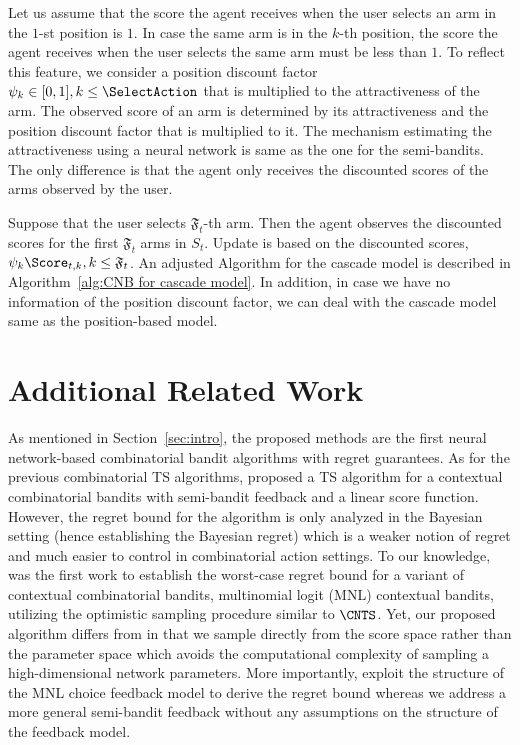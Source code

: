 \documentclass{article}
\theoremstyle{plain}
\begin{document}
Let us assume that the score the agent receives when the user selects an arm in the $1$-st position is $1$. 
In case the same arm is in the $k$-th position, the score the agent receives when the user selects the same arm must be less than $1$.
To reflect this feature, we consider a position discount factor $\psi_k \in [0,1], k \le \SelectAction$ that is multiplied to the attractiveness of the arm.
The observed score of an arm is determined by its attractiveness and the position discount factor that is multiplied to it.
The mechanism estimating the attractiveness using a neural network is same as the one for the semi-bandits.
The only difference is that the agent only receives the discounted scores of the arms observed by the user.

Suppose that the user selects $\mathfrak{F}_t$-th arm.
Then the agent observes the discounted scores for the first $\mathfrak{F}_t$ arms in $S_t$. 
Update is based on the discounted scores, $\psi_k \Score_{t,k}, k \le \mathfrak{F}_t$. 
An adjusted Algorithm for the cascade model is described in Algorithm~\ref{alg:CNB for cascade model}.
In addition, in case we have no information of the position discount factor, we can deal with the cascade model same as the position-based model.

\section{Additional Related Work}
As mentioned in Section~\ref{sec:intro}, the proposed methods are the first neural network-based combinatorial bandit algorithms with regret guarantees. As for the previous combinatorial TS algorithms, \citet{wen2015efficient} proposed a TS algorithm for a contextual combinatorial bandits with semi-bandit feedback and a linear score function. However, the regret bound for the algorithm is only analyzed in the Bayesian setting (hence establishing the Bayesian regret) which is a weaker notion of regret and much easier to control in combinatorial action settings. To our knowledge, \citet{oh2019thompson} was the first work to establish the worst-case regret bound for a variant of contextual combinatorial bandits, multinomial logit (MNL) contextual bandits, utilizing the optimistic sampling procedure similar to $\CNTS$. Yet, our proposed algorithm differs from \citet{oh2019thompson} in that we sample directly from the score space rather than the parameter space which avoids the computational complexity of sampling a high-dimensional network parameters. 
More importantly, \citet{oh2019thompson} exploit the structure of the MNL choice feedback model to derive the regret bound whereas we address a more general semi-bandit feedback without any assumptions on the structure of the feedback model. 
\end{document}

